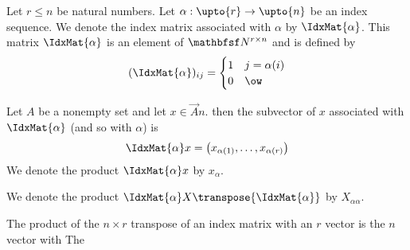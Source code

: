 
Let $r \leq n$ be natural numbers.
Let $\alpha: \upto{r} \to \upto{n}$ be an index sequence.
We denote the index matrix associated with $\alpha$ by $\IdxMat{\alpha}$.
This matrix $\IdxMat{\alpha}$ is an element of $\Mat{\N}{r}{n}$ and is defined by
$$
    (\IdxMat{\alpha})_{ij} = \begin{cases}
    1 & j = \alpha(i) \\
    0 & \ow
  \end{cases}
$$

Let $A$ be a nonempty set and let $x \in \Vec{A}{n}$.
then the subvector of $x$ associated with $\IdxMat{\alpha}$ (and so with $\alpha$) is
$$
  \IdxMat{\alpha}x = \pmat{x_{\alpha(1)}, \dots, x_{\alpha(r)}}
$$
We denote the product $\IdxMat{\alpha}x$ by $x_{\alpha}$.

We denote the product $\IdxMat{\alpha}X\transpose{\IdxMat{\alpha}}$ by $X_{\alpha\alpha}$.



The product of the $n \times r$ transpose of an index  matrix with an $r$ vector is the $n$ vector with
The
%
%
\strats
